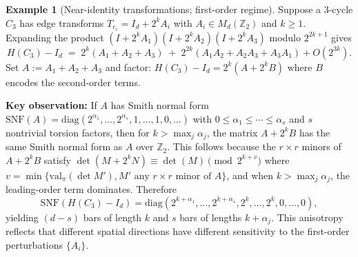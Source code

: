 \documentclass[11pt]{amsart}
\theoremstyle{plain}
\theoremstyle{definition}
\newtheorem{example}[theorem]{Example}
\newcommand{\valpi}{\mathrm{val}_{\unif}}                   %
\newcommand{\unif}{\pi}                        %
\begin{document}
\begin{example}[Near-identity transformations; first-order regime]
\label{ex:near-identity}
Suppose a 3-cycle $C_3$ has edge transforms $T_{e_i} = I_d + 2^k A_i$ with $A_i \in M_d(\mathbb{Z}_2)$ and $k \ge 1$. Expanding the product $(I + 2^k A_1)(I + 2^k A_2)(I + 2^k A_3)$ modulo $2^{2k+1}$ gives
\[
H(C_3) - I_d \;=\; 2^k(A_1 + A_2 + A_3) \;+\; 2^{2k}(A_1 A_2 + A_2 A_3 + A_3 A_1) + O(2^{3k}).
\]
Set $A := A_1 + A_2 + A_3$ and factor: $H(C_3) - I_d = 2^k(A + 2^k B)$ where $B$ encodes the second-order terms. 

\textbf{Key observation:} If $A$ has Smith normal form $\mathrm{SNF}(A) = \mathrm{diag}(2^{\alpha_1}, \ldots, 2^{\alpha_s}, 1, \ldots, 1, 0, \ldots)$ with $0 \le \alpha_1 \le \cdots \le \alpha_s$ and $s$ nontrivial torsion factors, then for $k > \max_j \alpha_j$, the matrix $A + 2^k B$ has the same Smith normal form as $A$ over $\mathbb{Z}_2$. This follows because the $r \times r$ minors of $A + 2^k B$ satisfy $\det(M + 2^k N) \equiv \det(M) \pmod{2^{k+v}}$ where $v = \min\{\valpi(\det M'), M' \text{ any } r \times r \text{ minor of } A\}$, and when $k > \max_j \alpha_j$, the leading-order term dominates. Therefore
\[
\mathrm{SNF}(H(C_3) - I_d) = \mathrm{diag}(2^{k+\alpha_1}, \ldots, 2^{k+\alpha_s}, 2^k, \ldots, 2^k, 0, \ldots, 0),
\]
yielding $(d-s)$ bars of length $k$ and $s$ bars of lengths $k + \alpha_j$. This anisotropy reflects that different spatial directions have different sensitivity to the first-order perturbations $\{A_i\}$.
\end{example}
\end{document}
